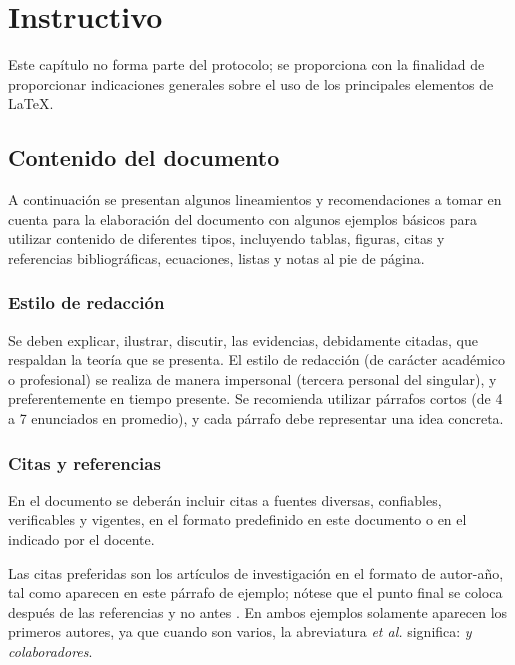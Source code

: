 \chapter{Instructivo}
\label{chap:instrucciones}

Este capítulo no forma parte del protocolo; se proporciona con la finalidad de proporcionar indicaciones generales sobre el uso de los principales elementos de \LaTeX. 

\section{Contenido del documento}
\label{sec:contenido}

A continuación se presentan algunos lineamientos y recomendaciones a tomar en cuenta para la elaboración del documento con algunos ejemplos básicos para utilizar contenido de diferentes tipos, incluyendo tablas, figuras, citas y referencias bibliográficas, ecuaciones, listas y notas al pie de página. 

\subsection{Estilo de redacción}
\label{sec:estilo}

Se deben explicar, ilustrar, discutir, las evidencias, debidamente citadas, que respaldan la teoría que se presenta. El estilo de redacción (de carácter académico o profesional) se realiza de manera impersonal (tercera personal del singular), y preferentemente en tiempo presente. Se recomienda utilizar párrafos cortos (de 4 a 7 enunciados en promedio), y cada párrafo debe representar una idea concreta.

\subsection{Citas y referencias}
\label{sec:citas}

En el documento se deberán incluir citas a fuentes diversas, confiables, verificables y vigentes, en el formato predefinido en este documento o en el indicado por el docente. 

Las citas preferidas son los artículos de investigación en el formato de autor-año, tal como aparecen en este párrafo de ejemplo; nótese que el punto final se coloca después de las referencias y no antes \citep{bib1,bib2}. En ambos ejemplos solamente aparecen los primeros autores, ya que cuando son varios, la abreviatura \textit{et al.} significa: \textit{y colaboradores}.

